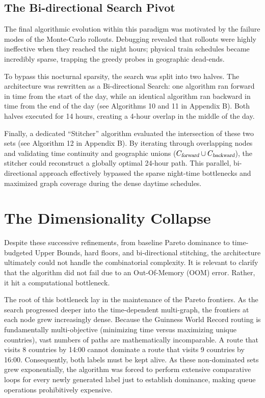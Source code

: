 \subsection{The Bi-directional Search Pivot}
\label{subsec:bidirectional_search_pivot}

The final algorithmic evolution within this paradigm was motivated by the failure modes of the Monte-Carlo rollouts. Debugging revealed that rollouts were highly ineffective when they reached the night hours; physical train schedules became incredibly sparse, trapping the greedy probes in geographic dead-ends.

\medskip

To bypass this nocturnal sparsity, the search was split into two halves. The architecture was rewritten as a Bi-directional Search: one algorithm ran forward in time from the start of the day, while an identical algorithm ran backward in time from the end of the day (see Algorithms 10 and 11 in Appendix B). Both halves executed for 14 hours, creating a 4-hour overlap in the middle of the day.

\medskip

Finally, a dedicated ``Stitcher'' algorithm evaluated the intersection of these two sets (see Algorithm 12 in Appendix B). By iterating through overlapping nodes and validating time continuity and geographic unions ($C_{\textsl{forward}} \cup C_{\textsl{backward}}$), the stitcher could reconstruct a globally optimal 24-hour path. This parallel, bi-directional approach effectively bypassed the sparse night-time bottlenecks and maximized graph coverage during the dense daytime schedules.

\section{The Dimensionality Collapse}
\label{sec:dimensionality_collapse}

Despite these successive refinements, from baseline Pareto dominance to time-budgeted Upper Bounds, hard floors, and bi-directional stitching, the architecture ultimately could not handle the combinatorial complexity. It is relevant to clarify that the algorithm did not fail due to an Out-Of-Memory (OOM) error. Rather, it hit a computational bottleneck.

\medskip

The root of this bottleneck lay in the maintenance of the Pareto frontiers. As the search progressed deeper into the time-dependent multi-graph, the frontiers at each node grew increasingly dense. Because the Guinness World Record routing is fundamentally multi-objective (minimizing time versus maximizing unique countries), vast numbers of paths are mathematically incomparable. A route that visits 8 countries by 14:00 cannot dominate a route that visits 9 countries by 16:00. Consequently, both labels must be kept alive. As these non-dominated sets grew exponentially, the algorithm was forced to perform extensive comparative loops for every newly generated label just to establish dominance, making queue operations prohibitively expensive.

